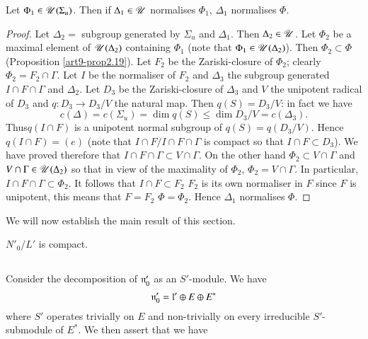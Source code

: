 \setcounter{proposition}{23}
\begin{proposition}\label{art9-prop2.24}
Let $\Phi_1 \in \mathscr{U} (\Sigma_u)$. Then if $\Delta_1 \in \mathscr{U}$ normalises $\Phi_1$, $\Delta_1$ normalises $\Phi$.
\end{proposition}

\begin{proof}
Let $\Delta_2 =$ subgroup generated by $\Sigma_u$ and $\Delta_1$. Then $\Delta_2 \in \mathscr{U}$. Let $\Phi_2$ be a maximal element of $\mathscr{U} (\Delta_2)$ containing $\Phi_1$ (note that $\Phi_1 \in \mathscr{U}(\Delta_2)$). Then $\Phi_2 \subset \Phi$ (Proposition \ref{art9-prop2.19}). Let $F_2$ be the Zariski-closure of $\Phi_2$; clearly $\Phi_2 = F_2 \cap \Gamma$. Let $I$ be the normaliser of $F_2$ and $\Delta_3$ the subgroup generated $I \cap F \cap \Gamma$ and $\Delta_2$. Let $D_3$ be the Zariski-closure of $\Delta_3$ and $V$ the unipotent radical of $D_3$ and $q : D_3 \to D_3 / V$ the natural map. Then $q (S) = D_3 / V$: in fact we have
$$
c(\Delta) = c (\Sigma_u) = \dim q (S) \leqslant \dim D_3 / V = c (\Delta_3).
$$
Thus\pageoriginale  $q(I \cap F)$ is a unipotent normal subgroup of $q(S) = q (D_3/ V)$. Hence $q(I \cap F) = (e)$ (note that $I \cap F/I \cap F \cap \Gamma$ is compact so that $I \cap F \subset D_3$). We have proved therefore that $I \cap F \cap \Gamma \subset V \cap \Gamma$. On the other hand $\Phi_2 \subset V \cap \Gamma$ and $V \cap \Gamma \in \mathscr{U} (\Delta_2)$ so that in view of the maximality of $\Phi_2$, $\Phi_2 = V \cap \Gamma$. In particular, $I \cap F \cap \Gamma \subset \Phi_2$. It follows that $I \cap F \subset F_2$ \ie $F_2$ is its own normaliser in $F$ since $F$ is unipotent, this means that $F = F_2$ \ie $\Phi = \Phi_2$. Hence $\Delta_1$ normalises $\Phi$.
\end{proof}

We will now establish the main result of this section.

\setcounter{theorem}{24}
\begin{theorem}\label{art9-thm2.25}
$N'_0/L'$ is compact.
\end{theorem}

\setcounter{subsection}{25}
\subsection{}\label{art9-subsec2.26}
Consider the decomposition of $\mathfrak{n}'_0$ as an $S'$-module. We have
$$
\mathfrak{n}'_0 = \mathfrak{l}' \oplus E \oplus E^\ast
$$
where $S'$ operates trivially on $E$ and non-trivially on every irreducible $S'$-submodule of $E^\ast$. We then assert that we have

